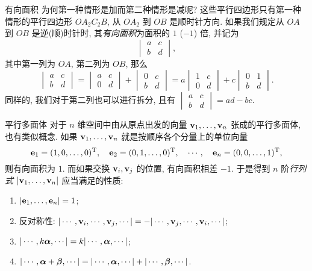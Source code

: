 \begin{frame}{有向面积\noexer}
	\onslide<+->
	为何第一种情形是加而第二种情形是减呢?
	\onslide<+->
	这些平行四边形只有第一种情形的平行四边形 $OA_2C_2B$, 从 $OA_2$ 到 $OB$ 是顺时针方向.
	\onslide<+->
	如果我们规定从 $OA$ 到 $OB$ 是逆(顺)时针时, 其\emph{有向面积}为面积的 $1$ ($-1$) 倍, 并记为
	\[\begin{vmatrix}
		a&c\\b&d
	\end{vmatrix},\]
	其中第一列为 $OA$, 第二列为 $OB$,
	\onslide<+->
	那么
	\[\begin{vmatrix}
		a&c\\b&d
	\end{vmatrix}=\begin{vmatrix}
		a&c\\0&d
	\end{vmatrix}+\begin{vmatrix}
		0&c\\b&d
	\end{vmatrix}=a\begin{vmatrix}
		1&c\\0&d
	\end{vmatrix}+c\begin{vmatrix}
		0&1\\b&d
	\end{vmatrix}.\]
	\onslide<+->
	同样的, 我们对于第二列也可以进行拆分, 且有 $\begin{vmatrix}
		a&c\\b&d
	\end{vmatrix}=ad-bc$.
\end{frame}


\begin{frame}{平行多面体\noexer}
	\onslide<+->
	对于 $n$ 维空间中由从原点出发的向量 ${\mathbf{v}}_1,\dots,{\mathbf{v}}_n$ 张成的平行多面体, 也有类似概念.
	\onslide<+->
	如果 ${\mathbf{v}}_1,\dots,{\mathbf{v}}_n$ 就是按顺序各个分量上的单位向量
	\[{\mathbf{e}}_1=(1,0,\dots,0)^{\mathrm{T}},\quad
	{\mathbf{e}}_2=(0,1,\dots,0)^{\mathrm{T}},\quad\cdots,\quad
	{\mathbf{e}}_n=(0,0,\dots,1)^{\mathrm{T}},\]
	则有向面积为 $1$.
	\onslide<+->
	而如果交换 ${\mathbf{v}}_i,{\mathbf{v}}_j$ 的位置, 有向面积相差 $-1$.
	\onslide<+->
	于是得到 $n$ 阶\emph{行列式} $|{\mathbf{v}}_1,\dots,{\mathbf{v}}_n|$ 应当满足的性质:
	\onslide<+->
	\begin{enumerate}
		\item $|{\mathbf{e}}_1,\dots,{\mathbf{e}}_n|=1$;
		\item 反对称性: $|\cdots,{\mathbf{v}}_i,\cdots,{\mathbf{v}}_j,\cdots|=-|\cdots,{\mathbf{v}}_j,\cdots,{\mathbf{v}}_i,\cdots|$;
		\item $|\cdots,k{\boldsymbol{\alpha}},\cdots|=k|\cdots,{\boldsymbol{\alpha}},\cdots|$;
		\item $|\cdots,{\boldsymbol{\alpha}}+{\boldsymbol{\beta}},\cdots|=|\cdots,{\boldsymbol{\alpha}},\cdots|+|\cdots,{\boldsymbol{\beta}},\cdots|$.
	\end{enumerate}
\end{frame}


